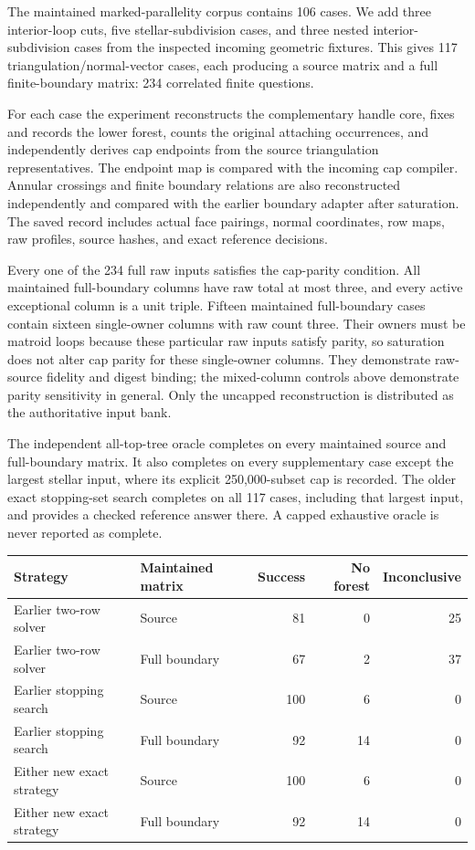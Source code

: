 The maintained marked-parallelity corpus contains 106 cases. We add three
interior-loop cuts, five stellar-subdivision cases, and three nested
interior-subdivision cases from the inspected incoming geometric fixtures.
This gives 117 triangulation/normal-vector cases, each producing a source
matrix and a full finite-boundary matrix: 234 correlated finite questions.

For each case the experiment reconstructs the complementary handle core,
fixes and records the lower forest, counts the original attaching
occurrences, and independently derives cap endpoints from the source
triangulation representatives. The endpoint map is compared with the
incoming cap compiler. Annular crossings and finite boundary relations are
also reconstructed independently and compared with the earlier boundary
adapter after saturation. The saved record includes actual face pairings,
normal coordinates, row maps, raw profiles, source hashes, and exact
reference decisions.

Every one of the 234 full raw inputs satisfies the cap-parity condition.
All maintained full-boundary columns have raw total at most three, and
every active exceptional column is a unit triple. Fifteen maintained
full-boundary cases contain sixteen single-owner columns with raw count
three. Their owners must be matroid loops because these particular raw
inputs satisfy parity, so saturation does not alter cap parity for these
single-owner columns. They demonstrate raw-source fidelity and digest
binding; the mixed-column controls above demonstrate parity sensitivity
in general. Only the uncapped
reconstruction is distributed as the authoritative input bank.

The independent all-top-tree oracle completes on every maintained source
and full-boundary matrix. It also completes on every supplementary case
except the largest stellar input, where its explicit 250,000-subset cap
is recorded. The older exact stopping-set search completes on all 117
cases, including that largest input, and provides a checked reference
answer there. A capped exhaustive oracle is never reported as complete.

\begin{center}
\begin{tabular}{@{}llrrr@{}}
\toprule
Strategy & Maintained matrix & Success & No forest & Inconclusive \\
\midrule
Earlier two-row solver & Source & 81 & 0 & 25 \\
Earlier two-row solver & Full boundary & 67 & 2 & 37 \\
Earlier stopping search & Source & 100 & 6 & 0 \\
Earlier stopping search & Full boundary & 92 & 14 & 0 \\
Either new exact strategy & Source & 100 & 6 & 0 \\
Either new exact strategy & Full boundary & 92 & 14 & 0 \\
\bottomrule
\end{tabular}
\end{center}

